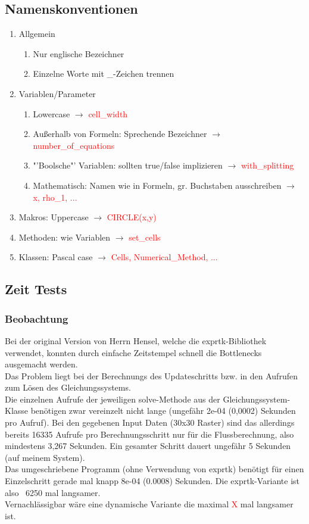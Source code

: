\documentclass[12pt]{article}
\begin{document}
\subsection{Namenskonventionen}
\begin{enumerate}
	\item Allgemein
	\begin{enumerate}
		\item Nur englische Bezeichner
		\item Einzelne Worte mit \_-Zeichen trennen
	\end{enumerate}
	\item Variablen/Parameter
	\begin{enumerate}
		\item Lowercase $\rightarrow$ \textcolor{red}{cell\_width}
		\item Außerhalb von Formeln: Sprechende Bezeichner $\rightarrow$ \textcolor{red}{number\_of\_equations}
		\item "'Boolsche"' Variablen: sollten true/false implizieren $\rightarrow$ \textcolor{red}{with\_splitting}
		\item Mathematisch: Namen wie in Formeln, gr. Buchstaben ausschreiben $\rightarrow$ \textcolor{red}{x, rho\_1, ...}
	\end{enumerate}
	\item Makros: Uppercase $\rightarrow$ \textcolor{red}{CIRCLE(x,y)}
	\item Methoden: wie Variablen $\rightarrow$ \textcolor{red}{set\_cells}
	\item Klassen: Pascal case $\rightarrow$ \textcolor{red}{Cells, Numerical\_Method, ...}
\end{enumerate}

\subsection{Zeit Tests}
\subsubsection{Beobachtung}
Bei der original Version von Herrn Hensel, welche die exprtk-Bibliothek verwendet, konnten durch einfache Zeitstempel schnell die Bottlenecks ausgemacht werden.\\
Das Problem liegt bei der Berechnungs des Updateschritts bzw. in den Aufrufen zum Lösen des Gleichungssystems.\\
Die einzelnen Aufrufe der jeweiligen solve-Methode aus der Gleichungssystem-Klasse benötigen zwar vereinzelt nicht lange (ungefähr 2e-04 (0,0002) Sekunden pro Aufruf). Bei den gegebenen Input Daten (30x30 Raster) sind das allerdings bereits 16335 Aufrufe pro Berechnungsschritt nur für die Flussberechnung, also mindestens 3,267 Sekunden. Ein gesamter Schritt dauert ungefähr 5 Sekunden (auf meinem System).\\
Das umgeschriebene Programm (ohne Verwendung von exprtk) benötigt für einen Einzelschritt gerade mal knapp 8e-04 (0.0008) Sekunden. Die exprtk-Variante ist also ~6250 mal langsamer.\\
Vernachlässigbar wäre eine dynamische Variante die maximal \textcolor{red}{X} mal langsamer ist.
\end{document}
